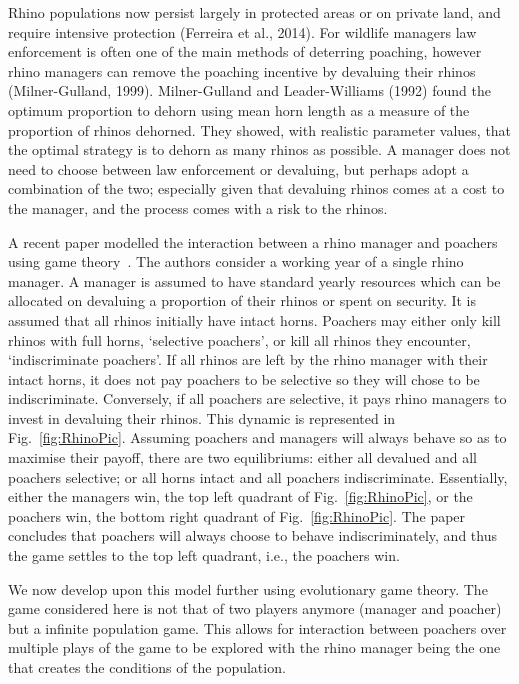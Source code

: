 \documentclass[10pt]{article}
\begin{document}
Rhino populations now persist largely in protected areas or on private land, and
require intensive protection (Ferreira et al., 2014). For wildlife managers law 
enforcement is often one of the main methods of deterring poaching, however 
rhino managers can remove the poaching incentive by devaluing their rhinos 
(Milner-Gulland, 1999). Milner-Gulland and Leader-Williams (1992) found the 
optimum proportion to dehorn using mean horn length as a measure of the 
proportion of rhinos dehorned. They showed, with realistic parameter values, 
that the optimal strategy is to dehorn as many rhinos as possible. 
A manager does not need to choose between law enforcement or devaluing, but
perhaps adopt a combination of the two; especially given that devaluing rhinos 
comes at a cost to the manager, and the process comes with a risk to the rhinos.

A recent paper modelled the interaction between a rhino manager and poachers
using game theory~\cite{Lee}.  The authors consider a working year of a single 
rhino manager.  A manager is assumed to have standard yearly resources which
can be allocated on devaluing a proportion of their rhinos or spent on security. 
It is assumed that all rhinos initially have intact horns. Poachers may either only
kill rhinos with full horns, `selective poachers', or kill all rhinos they encounter, 
`indiscriminate poachers'. If all rhinos are left by the rhino manager with their 
intact horns, it does not pay poachers to be selective so they will chose to be 
indiscriminate. Conversely, if all poachers are selective, it pays rhino managers 
to invest in devaluing their rhinos. This dynamic is represented in Fig.~\ref{fig:RhinoPic}.
Assuming poachers and managers will always behave so as to maximise their 
payoff, there are two equilibriums: either all devalued and all poachers selective;
or all horns intact and all poachers indiscriminate. Essentially, either the managers 
win, the top left quadrant of Fig.~\ref{fig:RhinoPic}, or the poachers win, the bottom
right quadrant of Fig.~\ref{fig:RhinoPic}. The paper concludes that poachers will
always choose to behave indiscriminately, and thus the game settles to the top
left quadrant, i.e., the poachers win.

We now develop upon this model further using evolutionary game theory. The 
game considered here is not that of two players anymore (manager and poacher)
but a infinite population game. This allows for interaction between poachers over 
multiple plays of the game to be explored with the rhino manager being the one 
that creates the conditions of the population. 
\end{document}
